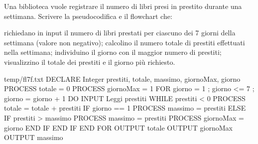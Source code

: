 \documentclass[11pt,fleqn]{book}
\begin{document}
\begin{esercizio}[2]
    Una biblioteca vuole registrare il numero di libri presi in prestito durante una settimana.
    Scrivere la pseudocodifica e il flowchart che:

        richiedano in input il numero di libri prestati per ciascuno dei 7 giorni della settimana (valore non negativo);
        calcolino il numero totale di prestiti effettuati nella settimana;
        individuino il giorno con il maggior numero di prestiti;
        visualizzino il totale dei prestiti e il giorno più richiesto.
    \ifsoluzioni
        \solution

        \begin{filecontents*}{temp/fl7f.txt}
        DECLARE Integer prestiti, totale, massimo, giornoMax, giorno
        PROCESS totale = 0
        PROCESS giornoMax = 1
        FOR giorno = 1 ; giorno <= 7 ; giorno = giorno + 1
            DO
                INPUT Leggi prestiti
            WHILE prestiti < 0
            PROCESS totale = totale + prestiti
            IF giorno == 1
                PROCESS massimo = prestiti
            ELSE
                IF prestiti > massimo
                    PROCESS massimo = prestiti
                    PROCESS giornoMax = giorno
                END IF
            END IF
        END FOR
        OUTPUT totale
        OUTPUT giornoMax
        OUTPUT massimo
        \end{filecontents*}

        \immediate{}
        
        \newpage

        \immediate{}
        
        \newpage
    \fi
\end{esercizio}
\end{document}
